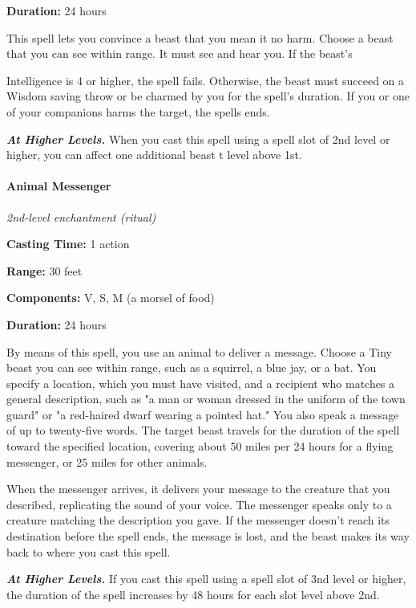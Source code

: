 \documentclass[
]{article}
\begin{document}
\textbf{Duration:} 24 hours

This spell lets you convince a beast that you mean it no harm. Choose a
beast that you can see within range. It must see and hear you. If the
beast's

Intelligence is 4 or higher, the spell fails. Otherwise, the beast must
succeed on a Wisdom saving throw or be charmed by you for the spell's
duration. If you or one of your companions harms the target, the spells
ends.

\emph{\textbf{At Higher Levels.}} When you cast this spell using a spell
slot of 2nd level or higher, you can affect one additional beast t level
above 1st.

\hypertarget{animal-messenger}{%
\paragraph{Animal Messenger}\label{animal-messenger}}

\emph{2nd-level enchantment (ritual)}

\textbf{Casting Time:} 1 action

\textbf{Range:} 30 feet

\textbf{Components:} V, S, M (a morsel of food)

\textbf{Duration:} 24 hours

By means of this spell, you use an animal to deliver a message. Choose a
Tiny beast you can see within range, such as a squirrel, a blue jay, or
a bat. You specify a location, which you must have visited, and a
recipient who matches a general description, such as "a man or woman
dressed in the uniform of the town guard" or "a red-haired dwarf wearing
a pointed hat." You also speak a message of up to twenty-five words. The
target beast travels for the duration of the spell toward the specified
location, covering about 50 miles per 24 hours for a flying messenger,
or 25 miles for other animals.

When the messenger arrives, it delivers your message to the creature
that you described, replicating the sound of your voice. The messenger
speaks only to a creature matching the description you gave. If the
messenger doesn't reach its destination before the spell ends, the
message is lost, and the beast makes its way back to where you cast this
spell.

\emph{\textbf{At Higher Levels.}} If you cast this spell using a spell
slot of 3nd level or higher, the duration of the spell increases by 48
hours for each slot level above 2nd.
\end{document}

